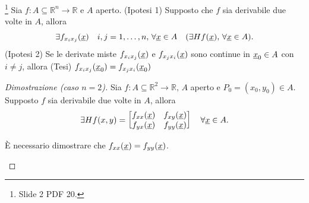 \begin{theorem}[di Schwarz]\label{th:schwarz}\footnote{Slide 2 PDF 20.}
	Sia $f:A\subseteq\mathbb{R}^n\rightarrow\mathbb{R}$ e $A$ aperto. (Ipotesi 1) Supposto che $f$ sia derivabile due volte in $A$, allora
	\begin{equation*}
		\exists f_{x_ix_j}(\uline x)\quad i,j=1,\hdots, n,\, \forall \uline x\in A\quad (\exists Hf(\uline x),\,\forall \uline x \in A).
	\end{equation*}
	(Ipotesi 2) Se le derivate miste $f_{x_ix_j}(\uline x)$ e $f_{x_jx_i}(\uline x)$ sono continue in $\uline x_0\in A$ con $i\neq j$, allora (Tesi) $f_{x_ix_j}(\uline x_0)=f_{x_jx_i}(\uline x_0)$
\end{theorem}
\begin{proof}[Dimostrazione (caso $n=2$)]
	Sia $f:A\subseteq\mathbb{R}^2\rightarrow\mathbb{R},\, A$ aperto e $P_0=(x_0,y_0)\in A$. Supposto $f$ sia derivabile due volte in $A$, allora
	\begin{equation*}
			\exists Hf(x,y) =
			\begin{bmatrix}
				f_{xx}(\uline x) & f_{xy}(\uline x)\\
				f_{yx}(\uline x) &  f_{yy}(\uline x)
			\end{bmatrix}\quad \forall \uline x \in A.
	\end{equation*}
	
	È necessario dimostrare che $f_{xx}(\uline x)=f_{yy}(\uline x)$.
	
	\begin{figure}[ht]
		\centering
\end{figure}
\end{proof}
